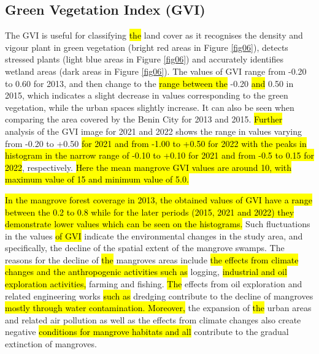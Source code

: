 \documentclass[jmse,article,submit,pdftex,moreauthors]{Definitions/mdpi}
\begin{document}
\subsection{Green Vegetation Index (GVI)}

The GVI is useful for classifying \hl{the }land cover as it recognises the density and vigour plant in green vegetation (bright red areas in Figure \ref{fig06}), detects stressed plants (light blue areas in Figure \ref{fig06}) and accurately identifies wetland areas (dark areas in Figure \ref{fig06}). The values of GVI range from -0.20 to 0.60 for 2013, and then change to the \hl{range between the} -0.20 \hl{and} 0.50 in 2015, which indicates a slight decrease in values corresponding to the green vegetation, while the urban spaces slightly increase. It can also be seen when comparing the area covered by the Benin City for 2013 and 2015. \hl{Further} analysis of the GVI image for 2021 and 2022 shows the range in values varying from -0.20 to +0.50 \hl{for 2021 and from -1.00 to +0.50 for 2022 with the peaks in histogram in the narrow range of -0.10 to +0.10 for 2021 and from -0.5 to 0.15 for 2022}, respectively. \hl{Here the mean mangrove GVI values are around 10, with maximum value of 15 and minimum value of 5.0. }

\hl{In the mangrove forest coverage in 2013, the obtained values of GVI have a range between the 0.2 to 0.8 while for the later periods (2015, 2021 and 2022) they demonstrate lower values which can be seen on the histograms. }Such fluctuations in the values \hl{of GVI }indicate the environmental changes in the study area, and specifically, the decline of the spatial extent of the mangrove swamps. The reasons for the decline of \hl{the }mangroves areas include \hl{the effects from climate changes and the anthropogenic activities such as }logging, \hl{industrial and oil exploration activities,} farming and fishing. \hl{The} effects from oil exploration and related engineering works \hl{such as }dredging contribute to the decline of mangroves \hl{mostly through water contamination. Moreover, }the expansion of \hl{the }urban areas and related air pollution as well as the effects from climate changes also create\hl{ }negative \hl{conditions for mangrove habitats and all }contribute to the gradual extinction of mangroves.
\end{document}
